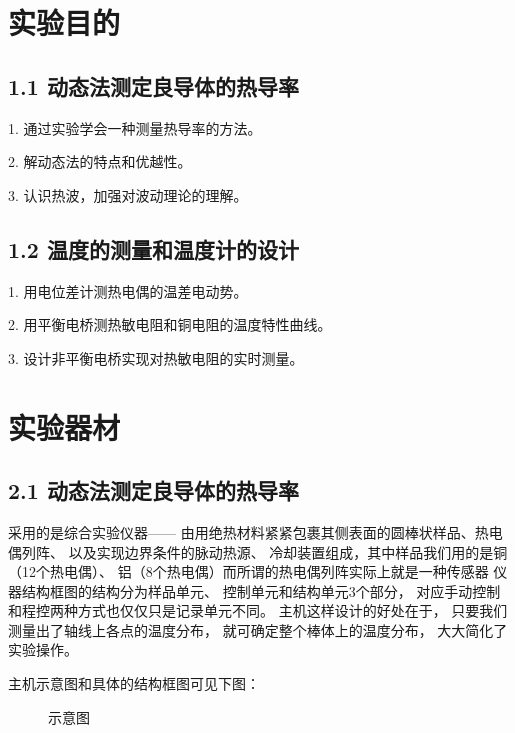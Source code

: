\documentclass[11pt]{article}
\begin{document}
\tableofcontents

\newpage 
\section{实验目的}

\subsection*{1.1 动态法测定良导体的热导率}

1. 通过实验学会一种测量热导率的方法。

2. 解动态法的特点和优越性。

3. 认识热波，加强对波动理论的理解。

\subsection*{1.2 温度的测量和温度计的设计}

1. 用电位差计测热电偶的温差电动势。

2. 用平衡电桥测热敏电阻和铜电阻的温度特性曲线。

3. 设计非平衡电桥实现对热敏电阻的实时测量。


\section{实验器材}

\subsection*{2.1 动态法测定良导体的热导率}

采用的是综合实验仪器——
由用绝热材料紧紧包裹其侧表面的圆棒状样品、热电偶列阵、
以及实现边界条件的脉动热源、
冷却装置组成，其中样品我们用的是铜（12个热电偶）、
铝（8个热电偶）而所谓的热电偶列阵实际上就是一种传感器
仪器结构框图的结构分为样品单元、
控制单元和结构单元3个部分，
对应手动控制和程控两种方式也仅仅只是记录单元不同。
主机这样设计的好处在于，
只要我们测量出了轴线上各点的温度分布，
就可确定整个棒体上的温度分布，
大大简化了实验操作。


主机示意图和具体的结构框图可见下图：
\begin{figure}[H]
    \centering
    \caption{示意图}
\end{figure}
\end{document}
